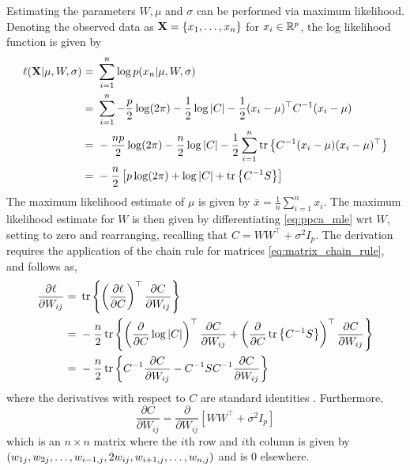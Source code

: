 \documentclass[12pt]{article}
\begin{document}
Estimating the parameters $W, \mu$ and $\sigma$ can be performed via maximum likelihood. Denoting the observed data as $\mathbf{X} = \{x_1, \dots, x_n \}$ for $x_i \in \mathbb{R}^p$, the log likelihood function is given by
\begin{align}
    \ell (\mathbf{X} | \mu, W, \sigma) = &\ \sum_{i=1}^{n} \log p(x_n | \mu, W, \sigma) 
    \nonumber \\
    = &\ \sum_{i=1}^{n} - \frac{p}{2} \log(2 \pi) - \frac{1}{2} \log | C | 
    - \frac{1}{2}(x_i - \mu)^\top C^{-1}(x_i-\mu) 
    \nonumber \\
    = &\ - \frac{np}{2} \log(2 \pi) - \frac{n}{2} \log | C | 
    - \frac{1}{2} \sum_{i=1}^{n} \operatorname{tr} \left\{ C^{-1}(x_i-\mu)(x_i - \mu)^\top \right\}
    \nonumber \\
    = &\ -\frac{n}{2} \left[ p \log(2 \pi) + \log | C | 
    + \operatorname{tr} \left\{ C^{-1} S \right\} \right]
    \label{eq:ppca_mle}
\end{align}
The maximum likelihood estimate of $\mu$ is given by $\bar{x} = \frac{1}{n} \sum_{i=1}^{n} x_i$. The maximum likelihood estimate for $W$ is then given by differentiating \eqref{eq:ppca_mle} wrt $W$, setting to zero and rearranging, recalling that $C = WW^\top + \sigma^2 I_p$. The derivation requires the application of the chain rule for matrices \eqref{eq:matrix_chain_rule}, and follows as,
\begin{align}
    \frac{\partial \ell}{\partial W_{ij}} = &\
    \operatorname{tr} \left\{ \left( \frac{\partial \ell}{\partial C} \right)^\top 
	\frac{\partial C}{\partial W_{ij}} \right\}  \nonumber \\
    = &\ - \frac{n}{2} \operatorname{tr} \left\{
	\left( \frac{\partial}{\partial C} \log | C | \right)^\top 
	\frac{\partial C}{\partial W_{ij}}
	+ \left( \frac{\partial}{\partial C} \operatorname{tr}  \left\{ C^{-1} S \right\} \right)^\top 
	\frac{\partial C}{\partial W_{ij}}
    \right\} \nonumber \\
    = &\ - \frac{n}{2} \operatorname{tr} \left\{
	C^{-1}          \frac{\partial C}{\partial W_{ij}}
      - C^{-1}SC^{-1}   \frac{\partial C}{\partial W_{ij}}
    \right\} \nonumber
\end{align}
where the derivatives with respect to $C$ are standard identities \citep[eq. (57), eq. (63)]{MCB}. Furthermore,
\begin{equation}
\frac{\partial C}{\partial W_{ij}} = \frac{\partial}{\partial W_{ij}} \left[
    WW^\top + \sigma^2 I_p \right] 
\end{equation}
which is an $n \times n$ matrix where the $i$th row and $i$th column is given by $(w_{1j}, w_{2j}, \dots,\\ w_{i-1, j}, 2 w_{ij}, w_{i+1,j}, \dots, w_{n, j})$ and is $0$ elsewhere.
\end{document}
